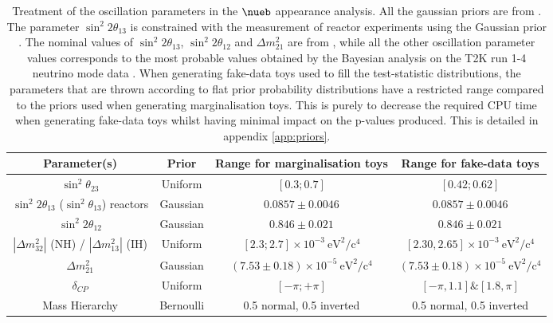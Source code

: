 \begin{table}
	\centering
	\begin{tabular}{| c | c | c | c |}
 	\hline
Parameter(s)													& Prior		& Range for marginalisation toys			              & Range for fake-data toys \\
\hline
$\sin^{2}\theta_{23}$											&  Uniform 	& $[0.3; 0.7]$     							 			  & $[0.42; 0.62]$	\\
$\sin^{2} 2 \theta_{13}$ ($\sin^{2} \theta_{13}$) reactors		&  Gaussian & $0.0857 \pm 0.0046$ 									  &	$0.0857 \pm 0.0046$ \\
$\sin^{2} 2 \theta_{12}$  										&  Gaussian & $0.846 \pm 0.021$ 									  &	$0.846 \pm 0.021$ \\
$|\Delta m^{2}_{32}|$ (NH) / $|\Delta m^{2}_{13}|$ (IH)      	&  Uniform	& $ [2.3; 2.7] \times 10^{-3}~\mbox{eV}^2/\mbox{c}^4$	  & $[2.30, 2.65] \times 10^{-3}~\mbox{eV}^2/\mbox{c}^4$ \\
$\Delta m^{2}_{21}$      										&  Gaussian & $(7.53 \pm 0.18) \times 10^{-5}~\mbox{eV}^2/\mbox{c}^4$ &	$(7.53 \pm 0.18) \times 10^{-5}~\mbox{eV}^2/\mbox{c}^4$\\
$\delta_{CP}$                                               	&  Uniform 	& $[-\pi; +\pi]$ 										  & $[-\pi, 1.1] \& [1.8, \pi]$\\
Mass Hierarchy													&  Bernoulli& 0.5 normal, 0.5 inverted 								  &	0.5 normal, 0.5 inverted\\  
\hline
\end{tabular}
\caption{
Treatment of the oscillation parameters in the $\nueb$ appearance analysis. All the gaussian priors are from \cite{pdg_2018}. The parameter $\sin^{2} 2 \theta_{13}$ is constrained with the measurement of reactor experiments using the Gaussian prior \cite{pdg_2018}. The nominal values of $\sin^2 2 \theta_{13}$, $\sin^2 2 \theta_{12}$ and $\Delta m^2_{21}$ are from \cite{pdg_2018}, while all the other oscillation parameter values corresponds to the most probable values obtained by the Bayesian analysis on the T2K run 1-4 neutrino mode data \cite{T2KLongPaper}. When generating fake-data toys used to fill the test-statistic distributions, the parameters that are thrown according to flat prior probability distributions have a restricted range compared to the priors used when generating marginalisation toys. This is purely to decrease the required CPU time when generating fake-data toys whilst having minimal impact on the p-values produced. This is detailed in appendix \ref{app:priors}.
}
\label{tab:osc_param_priors_nuebarapp_optimised}
\end{table}
